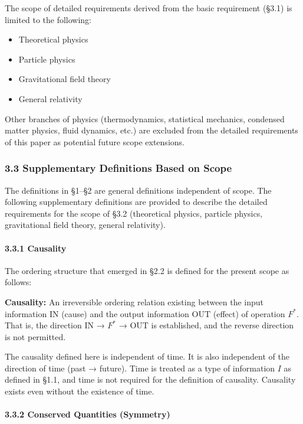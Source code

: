 \documentclass[a4paper,11pt]{article}
\providecommand{\tightlist}{\setlength{\itemsep}{0pt}\setlength{\parskip}{0pt}}
\begin{document}
The scope of detailed requirements derived from the basic requirement
(§3.1) is limited to the following:

\begin{itemize}
\tightlist
\item
  Theoretical physics
\item
  Particle physics
\item
  Gravitational field theory
\item
  General relativity
\end{itemize}

Other branches of physics (thermodynamics, statistical mechanics,
condensed matter physics, fluid dynamics, etc.) are excluded from the
detailed requirements of this paper as potential future scope
extensions.

\subsubsection{3.3 Supplementary Definitions Based on
Scope}\label{supplementary-definitions-based-on-scope}

The definitions in §1--§2 are general definitions independent of scope.
The following supplementary definitions are provided to describe the
detailed requirements for the scope of §3.2 (theoretical physics,
particle physics, gravitational field theory, general relativity).

\paragraph{3.3.1 Causality}\label{causality}

The ordering structure that emerged in §2.2 is defined for the present
scope as follows:

\textbf{Causality:} An irreversible ordering relation existing between
the input information \(\mathrm{IN}\) (cause) and the output information
\(\mathrm{OUT}\) (effect) of operation \(F^*\). That is, the direction
\(\mathrm{IN}\) → \(F^*\) → \(\mathrm{OUT}\) is established, and the
reverse direction is not permitted.

The causality defined here is independent of time. It is also
independent of the direction of time (past → future). Time is treated as
a type of information \(I\) as defined in §1.1, and time is not required
for the definition of causality. Causality exists even without the
existence of time.

\paragraph{3.3.2 Conserved Quantities
(Symmetry)}\label{conserved-quantities-symmetry}
\end{document}
